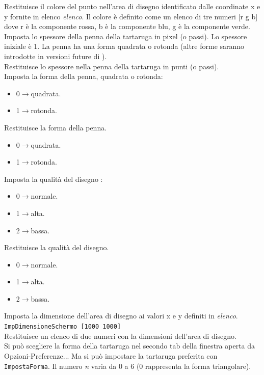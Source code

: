  Restituisce il colore del punto nell'area di disegno identificato dalle coordinate x e y fornite in elenco \textit{elenco}. Il colore è definito come un elenco di tre numeri [r g b] dove r è la componente rossa, b è la componente blu, g è la componente verde.\\
 Imposta lo spessore della penna della tartaruga in pixel (o passi). Lo spessore iniziale è 1. La penna ha una forma quadrata o rotonda (altre forme saranno introdotte in versioni future di \xlogo).\\
 Restituisce lo spessore nella penna della tartaruga in punti (o passi).\\
 Imposta la forma della penna, quadrata o rotonda:
\begin{itemize}
	\item 0$\to$quadrata.
	\item 1$\to$rotonda.
\end{itemize}
\noindent
{}
Restituisce la forma della penna.
\begin{itemize}
	\item 0$\to$quadrata.
	\item 1$\to$rotonda.
\end{itemize}
\noindent
{}
Imposta la qualità del disegno :
\begin{itemize}
	\item  0$\to$normale.
	\item  1$\to$alta.
	\item  2$\to$bassa.
\end{itemize}
\noindent
{}
Restituisce la qualità del disegno.
\begin{itemize}
	\item  0$\to$normale.
	\item  1$\to$alta.
	\item  2$\to$bassa.
\end{itemize}
\noindent
{}
Imposta la dimensione dell'area di disegno ai valori x e y definiti in \textit{elenco}. \texttt{ImpDimensioneSchermo [1000 1000]}\\
Restituisce un elenco di due numeri con la dimensioni dell'area di disegno.\\
Si può scegliere la forma della tartaruga nel secondo tab della finestra aperta da Opzioni-Preferenze... Ma si può impostare la tartaruga preferita con \texttt{ImpostaForma}. Il numero \textit{n} varia da 0 a 6 (0 rappresenta la forma triangolare).\\
